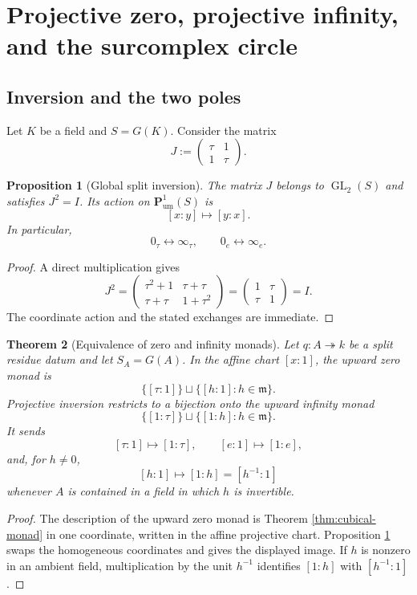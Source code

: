 \documentclass[11pt]{amsart}
\numberwithin{equation}{section}
\newtheorem{theorem}{Theorem}[section]
\newtheorem{proposition}[theorem]{Proposition}
\theoremstyle{definition}
\newcommand{\GL}{\operatorname{GL}}
\newcommand{\Pum}{\mathbf P_{\mathrm{um}}}
\begin{document}
\section{Projective zero, projective infinity, and the surcomplex circle}

\subsection{Inversion and the two poles}

Let $K$ be a field and $S=G(K)$.  Consider the matrix
\[
J:=
\begin{pmatrix}
\tau&1\\
1&\tau
\end{pmatrix}.
\]

\begin{proposition}[Global split inversion]\label{prop:global-inversion}
The matrix $J$ belongs to $\GL_2(S)$ and satisfies $J^2=I$.  Its action on $\Pum^1(S)$ is
\[
[x:y]\longmapsto[y:x].
\]
In particular,
\[
0_\tau\longleftrightarrow\infty_\tau,
\qquad
0_e\longleftrightarrow\infty_e.
\]
\end{proposition}

\begin{proof}
A direct multiplication gives
\[
J^2
=
\begin{pmatrix}
\tau^2+1&\tau+\tau\\
\tau+\tau&1+\tau^2
\end{pmatrix}
=
\begin{pmatrix}
1&\tau\\
\tau&1
\end{pmatrix}
=I.
\]
The coordinate action and the stated exchanges are immediate.
\end{proof}

\begin{theorem}[Equivalence of zero and infinity monads]\label{thm:zero-infinity-monads}
Let $q:A\twoheadrightarrow k$ be a split residue datum and let $S_A=G(A)$.  In the affine chart $[x:1]$, the upward zero monad is
\[
\{[\tau:1]\}
\sqcup
\{[h:1]:h\in\mathfrak m\}.
\]
Projective inversion restricts to a bijection onto the upward infinity monad
\[
\{[1:\tau]\}
\sqcup
\{[1:h]:h\in\mathfrak m\}.
\]
It sends
\[
[\tau:1]\mapsto[1:\tau],
\qquad
[e:1]\mapsto[1:e],
\]
and, for $h\neq0$,
\[
[h:1]\mapsto[1:h]=[h^{-1}:1]
\]
whenever $A$ is contained in a field in which $h$ is invertible.
\end{theorem}

\begin{proof}
The description of the upward zero monad is Theorem \ref{thm:cubical-monad} in one coordinate, written in the affine projective chart.  Proposition \ref{prop:global-inversion} swaps the homogeneous coordinates and gives the displayed image.  If $h$ is nonzero in an ambient field, multiplication by the unit $h^{-1}$ identifies $[1:h]$ with $[h^{-1}:1]$.
\end{proof}
\end{document}
